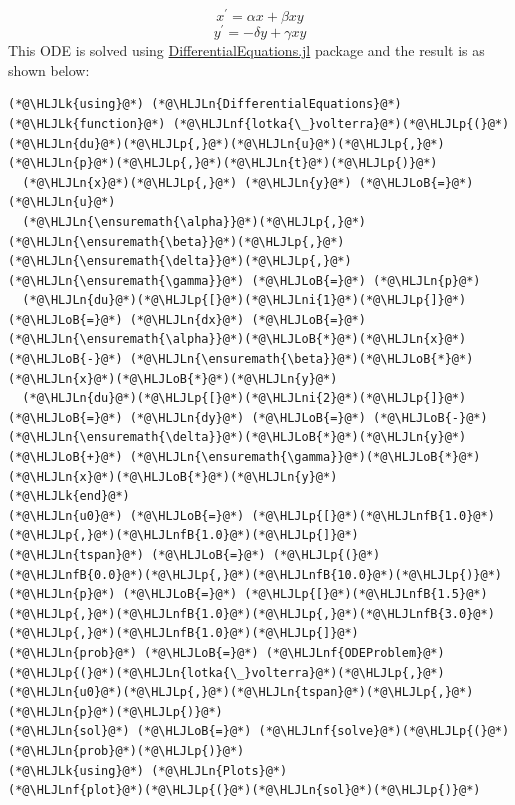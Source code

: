 \documentclass[12pt,a4paper]{article}
\newcommand{\HLJLk}[1]{\textcolor[RGB]{148,91,176}{\textbf{#1}}}
\newcommand{\HLJLn}[1]{#1}
\newcommand{\HLJLnf}[1]{\textcolor[RGB]{66,102,213}{#1}}
\newcommand{\HLJLnfB}[1]{\textcolor[RGB]{59,151,46}{#1}}
\newcommand{\HLJLni}[1]{\textcolor[RGB]{59,151,46}{#1}}
\newcommand{\HLJLoB}[1]{\textcolor[RGB]{102,102,102}{\textbf{#1}}}
\newcommand{\HLJLp}[1]{#1}
\begin{document}
\[
x^\prime = \alpha x + \beta x y
\]
\[
y^\prime = -\delta y + \gamma x y
\]
This ODE is solved using \href{}{DifferentialEquations.jl} package and the result is as shown below:


\begin{lstlisting}
(*@\HLJLk{using}@*) (*@\HLJLn{DifferentialEquations}@*)
(*@\HLJLk{function}@*) (*@\HLJLnf{lotka{\_}volterra}@*)(*@\HLJLp{(}@*)(*@\HLJLn{du}@*)(*@\HLJLp{,}@*)(*@\HLJLn{u}@*)(*@\HLJLp{,}@*)(*@\HLJLn{p}@*)(*@\HLJLp{,}@*)(*@\HLJLn{t}@*)(*@\HLJLp{)}@*)
  (*@\HLJLn{x}@*)(*@\HLJLp{,}@*) (*@\HLJLn{y}@*) (*@\HLJLoB{=}@*) (*@\HLJLn{u}@*)
  (*@\HLJLn{\ensuremath{\alpha}}@*)(*@\HLJLp{,}@*) (*@\HLJLn{\ensuremath{\beta}}@*)(*@\HLJLp{,}@*) (*@\HLJLn{\ensuremath{\delta}}@*)(*@\HLJLp{,}@*) (*@\HLJLn{\ensuremath{\gamma}}@*) (*@\HLJLoB{=}@*) (*@\HLJLn{p}@*)
  (*@\HLJLn{du}@*)(*@\HLJLp{[}@*)(*@\HLJLni{1}@*)(*@\HLJLp{]}@*) (*@\HLJLoB{=}@*) (*@\HLJLn{dx}@*) (*@\HLJLoB{=}@*) (*@\HLJLn{\ensuremath{\alpha}}@*)(*@\HLJLoB{*}@*)(*@\HLJLn{x}@*) (*@\HLJLoB{-}@*) (*@\HLJLn{\ensuremath{\beta}}@*)(*@\HLJLoB{*}@*)(*@\HLJLn{x}@*)(*@\HLJLoB{*}@*)(*@\HLJLn{y}@*)
  (*@\HLJLn{du}@*)(*@\HLJLp{[}@*)(*@\HLJLni{2}@*)(*@\HLJLp{]}@*) (*@\HLJLoB{=}@*) (*@\HLJLn{dy}@*) (*@\HLJLoB{=}@*) (*@\HLJLoB{-}@*)(*@\HLJLn{\ensuremath{\delta}}@*)(*@\HLJLoB{*}@*)(*@\HLJLn{y}@*) (*@\HLJLoB{+}@*) (*@\HLJLn{\ensuremath{\gamma}}@*)(*@\HLJLoB{*}@*)(*@\HLJLn{x}@*)(*@\HLJLoB{*}@*)(*@\HLJLn{y}@*)
(*@\HLJLk{end}@*)
(*@\HLJLn{u0}@*) (*@\HLJLoB{=}@*) (*@\HLJLp{[}@*)(*@\HLJLnfB{1.0}@*)(*@\HLJLp{,}@*)(*@\HLJLnfB{1.0}@*)(*@\HLJLp{]}@*)
(*@\HLJLn{tspan}@*) (*@\HLJLoB{=}@*) (*@\HLJLp{(}@*)(*@\HLJLnfB{0.0}@*)(*@\HLJLp{,}@*)(*@\HLJLnfB{10.0}@*)(*@\HLJLp{)}@*)
(*@\HLJLn{p}@*) (*@\HLJLoB{=}@*) (*@\HLJLp{[}@*)(*@\HLJLnfB{1.5}@*)(*@\HLJLp{,}@*)(*@\HLJLnfB{1.0}@*)(*@\HLJLp{,}@*)(*@\HLJLnfB{3.0}@*)(*@\HLJLp{,}@*)(*@\HLJLnfB{1.0}@*)(*@\HLJLp{]}@*)
(*@\HLJLn{prob}@*) (*@\HLJLoB{=}@*) (*@\HLJLnf{ODEProblem}@*)(*@\HLJLp{(}@*)(*@\HLJLn{lotka{\_}volterra}@*)(*@\HLJLp{,}@*)(*@\HLJLn{u0}@*)(*@\HLJLp{,}@*)(*@\HLJLn{tspan}@*)(*@\HLJLp{,}@*)(*@\HLJLn{p}@*)(*@\HLJLp{)}@*)
(*@\HLJLn{sol}@*) (*@\HLJLoB{=}@*) (*@\HLJLnf{solve}@*)(*@\HLJLp{(}@*)(*@\HLJLn{prob}@*)(*@\HLJLp{)}@*)
(*@\HLJLk{using}@*) (*@\HLJLn{Plots}@*)
(*@\HLJLnf{plot}@*)(*@\HLJLp{(}@*)(*@\HLJLn{sol}@*)(*@\HLJLp{)}@*)
\end{lstlisting}
\end{document}
